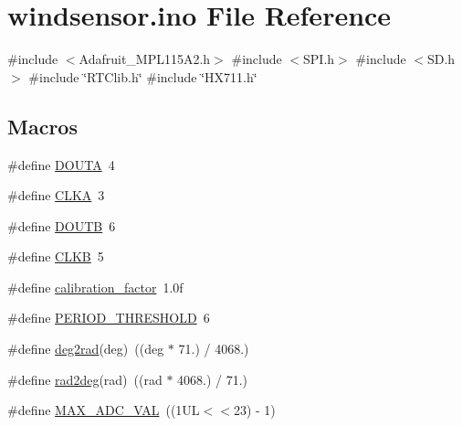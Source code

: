 \hypertarget{windsensor_8ino}{}\section{windsensor.\+ino File Reference}
\label{windsensor_8ino}
{\ttfamily \#include $<$Adafruit\+\_\+\+M\+P\+L115\+A2.\+h$>$}\newline
{\ttfamily \#include $<$S\+P\+I.\+h$>$}\newline
{\ttfamily \#include $<$S\+D.\+h$>$}\newline
{\ttfamily \#include \char`\"{}R\+T\+Clib.\+h\char`\"{}}\newline
{\ttfamily \#include \char`\"{}H\+X711.\+h\char`\"{}}\newline
\subsection*{Macros}
\begin{DoxyCompactItemize}
\item 
\#define \mbox{\hyperlink{windsensor_8ino_a1536230053989f05113870b57c81b368}{D\+O\+U\+TA}}~4
\item 
\#define \mbox{\hyperlink{windsensor_8ino_a6a5dcd886a8a52cab810eb8a461c96f5}{C\+L\+KA}}~3
\item 
\#define \mbox{\hyperlink{windsensor_8ino_a3d0814fa8af472164fbf0843faa35d5c}{D\+O\+U\+TB}}~6
\item 
\#define \mbox{\hyperlink{windsensor_8ino_aeeac7c3e17c81d104245d857c7bd184f}{C\+L\+KB}}~5
\item 
\#define \mbox{\hyperlink{windsensor_8ino_adb3564163b909516cbda0c168dbba86a}{calibration\+\_\+factor}}~1.\+0f
\item 
\#define \mbox{\hyperlink{windsensor_8ino_a4b6027f22a7f9e0128f472f0526ce23d}{P\+E\+R\+I\+O\+D\+\_\+\+T\+H\+R\+E\+S\+H\+O\+LD}}~6
\item 
\#define \mbox{\hyperlink{windsensor_8ino_a894738198a00b6a55e87799c0f8712bb}{deg2rad}}(deg)~((deg $\ast$ 71.) / 4068.)
\item 
\#define \mbox{\hyperlink{windsensor_8ino_aa0a2b2d4d920457dad62bbe8e268850e}{rad2deg}}(rad)~((rad $\ast$ 4068.) / 71.)
\item 
\#define \mbox{\hyperlink{windsensor_8ino_a4de85d5ed3adfe2aa94a81e7b4cf8829}{M\+A\+X\+\_\+\+A\+D\+C\+\_\+\+V\+AL}}~((1\+U\+L$<$$<$23) -\/ 1)
\end{DoxyCompactItemize}
